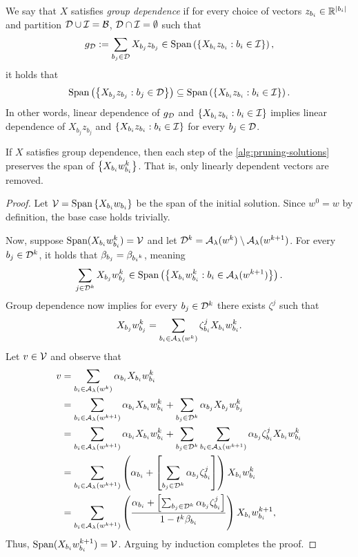 \begin{definition}\label{def:group-dependence}
	We say that \( X \) satisfies \emph{group dependence} if for every choice of
	vectors \( z_{{b_i}} \in \mathbb{R}^{|{b_i}|} \) and partition
	\( \mathcal{D} \cup \mathcal{I} = \mathcal{B} \), \( \mathcal{D} \cap \mathcal{I} = \emptyset \) such
	that
	\[
		g_{\mathcal{D}} := \sum_{b_j \in \mathcal{D}} X_{b_j} z_{b_j}
		\in \text{Span}\left(\left\{X_{b_i} z_{{b_i}} : {b_i} \in \mathcal{I}\right\}\right),
	\]
	it holds that
	\[
		\text{Span}\left(\left\{X_{b_j} z_{b_j} : b_j \in \mathcal{D}\right\}\right)
		\subseteq \text{Span}\left(\left\{X_{b_i} z_{{b_i}} : {b_i} \in \mathcal{I}\right\}\right).
	\]
	In other words, linear dependence of
	\( g_{\mathcal{D}} \)  and \( \left\{X_{b_i} z_{{b_i}} : {b_i} \in \mathcal{I}\right\} \) implies
	linear dependence of \( X_{b_j} z_{b_j} \) and
	\( \left\{X_{b_i} z_{{b_i}} : {b_i} \in \mathcal{I}\right\} \) for every \( b_j \in \mathcal{D} \).
\end{definition}


\begin{lemma}\label{lemma:pruning-span}
	If \( X \) satisfies group dependence, then each step of the
	\cref{alg:pruning-solutions} preserves the span of \( \left\{X_{b_i} w_{b_i}^k \right\} \).
	That is, only linearly dependent vectors are removed.
\end{lemma}
\begin{proof}
	Let \( \mathcal{V} = \text{Span}\left\{X_{b_i} w_{b_i} \right\} \) be the span of the initial solution.
	Since \( w^0 = w \) by definition, the base case holds trivially.

	Now, suppose \( \text{Span}(X_{b_i} w_{b_i}^{k}) = \mathcal{V} \) and let
	\( \mathcal{D}^k = {\mathcal{A}_{\lambda}}(w^{k}) \setminus {\mathcal{A}_{\lambda}}(w^{k+1}) \).
	For every \( b_j \in \mathcal{D}^k \), it holds that \( \beta_{b_j} = \beta_{{b_i}^k} \),
	meaning
	\[
		\sum_{j \in \mathcal{D}^k} X_{b_j} w_{b_j}^k \in \text{Span}\left(\left\{X_{b_i} w_{b_i}^k : {b_i} \in {\mathcal{A}_{\lambda}}(w^{k+1})\right\}\right).
	\]
	Group dependence now implies for every \( b_j \in \mathcal{D}^k \) there exists \( \zeta^j \)
	such that
	\[
		X_{b_j} w_{b_j}^k = \sum_{{b_i} \in {\mathcal{A}_{\lambda}}(w^k)} \zeta^j_{{b_i}} X_{b_i} w_{b_i}^k.
	\]
	Let \( v \in \mathcal{V} \) and observe that
	\begin{align*}
		v
		 & = \sum_{{b_i} \in {\mathcal{A}_{\lambda}}(w^k)} \alpha_{b_i} X_{b_i} w_{b_i}^k                  \\
		 & = \sum_{{b_i} \in {\mathcal{A}_{\lambda}}(w^{k+1})} \alpha_{b_i} X_{b_i} w_{b_i}^k
		+ \sum_{b_j \in \mathcal{D}^k} \alpha_{b_j} X_{b_j} w_{b_j}^{k}            \\
		 & = \sum_{{b_i} \in {\mathcal{A}_{\lambda}}(w^{k+1})} \alpha_{b_i} X_{b_i} w_{b_i}^k
		+ \sum_{b_j \in \mathcal{D}^k}
		\sum_{{b_i} \in {\mathcal{A}_{\lambda}}(w^{k+1})} \alpha_{b_j} \zeta_{b_i}^j X_{b_i} w_{b_i}^{k} \\
		 & = \sum_{{b_i} \in {\mathcal{A}_{\lambda}}(w^{k+1})}
		\left(\alpha_{b_i} + \left[\sum_{b_j \in \mathcal{D}^k} \alpha_{b_j} \zeta_{b_i}^j\right]\right)
		X_{b_i} w_{b_i}^{k}                                                         \\
		 & = \sum_{{b_i} \in {\mathcal{A}_{\lambda}}(w^{k+1})}
		\left(\frac{\alpha_{b_i} + \left[\sum_{b_j \in \mathcal{D}^k}
					\alpha_{b_j} \zeta_{b_i}^j\right]}{1 - t^k \beta_{b_i}}\right)
		X_{b_i} w_{b_i}^{k+1},
	\end{align*}
	Thus, \( \text{Span}(X_{b_i} w_{b_i}^{k+1}) = \mathcal{V}  \).
	Arguing by induction completes the proof.
\end{proof}

